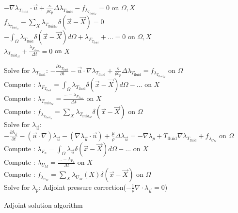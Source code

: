 \documentclass[10pt]{article} %
\begin{document}
\begin{center}
	$-\nabla \lambda_{T_{\text{fluid}}} \cdot \vec{u} + \frac{\kappa}{\rho c_p} \Delta  \lambda_{T_{\text{fluid}}} - f_{\lambda_{T_{\text{fluid}_M}}} = 0$ \quad on $\Omega,X$\\
	$f_{\lambda_{T_{\text{fluid}_M}}} - \sum_{X} \lambda_{T_{\text{fluid}_M}} \delta (\vec{x}-\vec{X}) = 0$\\
	$-\int_{\Omega} \lambda_{T_{\text{fluid}}} \delta (\vec{x}-\vec{X}) d\Omega + \lambda_{F_{T_{\text{fluid}}}} + ... = 0$ \quad on $\Omega, X$\\
	$\lambda_{T_{\text{fluid}_M}} + \frac{\lambda_{F_{T_{\text{fluid}}}}}{\Delta t} =0$ \quad on $X$
	
	\newpage
\begin{algorithm}[H]
	\SetAlgoLined
	{
		{
			Solve for $\lambda_{T_{\text{fluid}}}$: $- \frac{\partial \lambda_{T_{\text{fluid}}}}{\partial t} -\vec{u} \cdot \nabla \lambda_{T_{\text{fluid}}} + \frac{\kappa}{\rho c_p} \Delta  \lambda_{T_{\text{fluid}}} = f_{\lambda_{T_{\text{fluid}_M}}} $ \quad on $\Omega$\\
			Compute : $\lambda_{F_{T_{\text{fluid}}}} = \int_{\Omega} \lambda_{T_{\text{fluid}}} \delta (\vec{x}-\vec{X}) d\Omega - ... $ \quad on $X$\\
			Compute : $\lambda_{T_{\text{fluid}_M}} = \frac{... - \lambda_{F_{T_{\text{fluid}}}}}{\Delta t}$ \quad on $X$\\
			Compute : $f_{\lambda_{T_{\text{fluid}_M}}} = \sum_{X} \lambda_{T_{\text{fluid}_M}} \delta (\vec{x}-\vec{X})$ \quad on $\Omega$\\
		}
		{
			Solve for $\lambda_{\vec{u}}$: $ -\frac{\partial \lambda_{\vec{u}}}{\partial t}-(\vec{u}\cdot\nabla) \lambda_{\vec{u}} - \left(\nabla \lambda_{\vec{u}} \cdot \vec{u}\right) + \frac{\mu}{\rho} \Delta \lambda_{\vec{u}} = - \nabla\lambda_p + T_{\text{fluid}} \nabla \lambda_{T_{\text{fluid}}} + f_{\lambda_{U_M}}$ \quad on $\Omega$\\
			Compute : $\lambda_{F_u} = \int_{\Omega} \lambda_{\vec{u}} \delta (\vec{x}-\vec{X}) d\Omega - ...$  \quad on $X$\\
			Compute : $\lambda_{U_M} = \frac{...-\lambda_{F_u}}{\Delta t}$ \quad on $X$\\
			Compute : $f_{\lambda_{U_M}} = \sum_X \lambda_{U_M}(X) \delta(\vec{x}-\vec{X})$ \quad on $\Omega$\\
			Solve for $\lambda_p$: Adjoint pressure correction($-\frac{1}{\rho} \nabla \cdot \lambda_{\vec{u}}=0$)\\
		}
	}
	\caption{Adjoint solution algorithm}
\end{algorithm}


\end{center}
\end{document}
